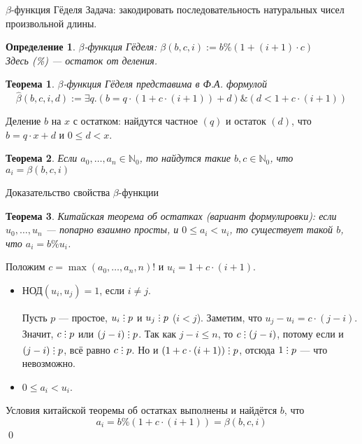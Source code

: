 \documentclass[handout]{beamer}
\newtheorem{thm}{Теорема}[section]
\newtheorem{dfn}{Определение}[section]
\newcommand{\divisible}%
{\mathrel{\lower.2ex%
\vbox{\baselineskip=0.7ex\lineskiplimit=0pt%
\kern6pt \hbox{.}\hbox{.}\hbox{.}}%
}}
\begin{document}
\begin{frame}{$\beta$-функция Гёделя}
Задача: закодировать последовательность натуральных чисел произвольной длины.\pause
\begin{dfn}$\beta$-функция Гёделя: $\mathcal{\beta}(b,c,i) := b \% (1 + (i+1) \cdot c)$\\
Здесь (\%) --- остаток от деления.
\end{dfn}\pause
\begin{thm}$\beta$-функция Гёделя представима в Ф.А. формулой
$$\hat{\beta}(b,c,i,d) := \exists q.(b = q \cdot (1 + c \cdot (i+1)) + d) \& (d < 1 + c \cdot (i+1))$$
\end{thm}\pause\vspace{-0.3cm}
Деление $b$ на $x$ с остатком: найдутся частное $(q)$ и остаток $(d)$, что
$b = q\cdot x + d$ и $0 \le d < x$.
\pause
\begin{thm}Если $a_0, \dots, a_n \in \mathbb{N}_0$, то найдутся такие $b,c \in \mathbb{N}_0$, что
$a_i = \beta(b,c,i)$
\end{thm}
\end{frame}

\begin{frame}{Доказательство свойства $\beta$-функции}
\begin{thm}Китайская теорема об остатках (вариант формулировки): если $u_0, \dots, u_n$ --- попарно 
взаимно просты, и $0 \le a_i < u_i$, то существует такой $b$, что $a_i = b \% u_i$.
\end{thm}\pause
Положим $c = \max(a_0,\dots,a_n,n)!$ и $u_i = 1+c\cdot(i+1)$.\pause
\begin{itemize}
\item $\text{НОД}(u_i,u_j) = 1$, если $i \ne j$.\pause

Пусть $p$ --- простое, $u_i\divisible p$ и $u_j\divisible p$ ($i < j$). \pause
Заметим, что $u_j-u_i = c \cdot (j-i)$. Значит, $c\divisible p$ или $(j-i)\divisible p$. \pause
Так как $j-i \le n$, то $c \divisible (j-i)$, потому если и $(j-i)\divisible p$, всё равно $c \divisible p$. \pause
Но и $(1+c\cdot(i+1))\divisible p$, отсюда $1 \divisible p$ --- что невозможно. \pause
\item $0 \le a_i < u_i$.\pause
\end{itemize}
Условия китайской теоремы об остатках выполнены и найдётся $b$, что \vspace{-0.2cm}
$$a_i = b \% (1 + c\cdot(i+1)) = \beta(b,c,i)$$
\qed
\end{frame}
\end{document}
